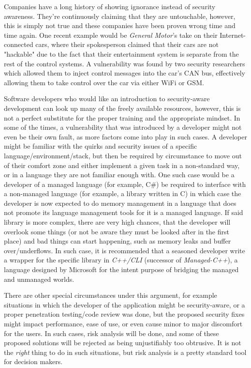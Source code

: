 \documentclass[a4paper,12pt]{article}
\begin{document}
	Companies have a long history of showing ignorance instead of security awareness. They're continuously claiming that they are untouchable, however, this is simply not true and these companies have been proven wrong time and time again. One recent example would be \textit{General Motor}'s take on their Internet-connected cars, where their spokesperson claimed that their cars are not "hackable" due to the fact that their entertainment system is separate from the rest of the control systems. A vulnerability was found by two security researchers\cite{cmiller15} which allowed them to inject control messages into the car's CAN bus, effectively allowing them to take control over the car via either WiFi or GSM.
	
	Software developers who would like an introduction to security-aware development can look up many of the freely available resources, however, this is not a perfect substitute for the proper training and the appropriate mindset. In some of the times, a vulnerability that was introduced by a developer might not even be their own fault, as more factors come into play in such cases. A developer might be familiar with the quirks and security issues of a specific language/environment/stack, but then be required by circumstance to move out of their comfort zone and either implement a given task in a non-standard way, or in a language they are not familiar enough with. One such case would be a developer of a managed language (for example, C\#) be required to interface with a non-managed language (for example, a library written in C) in which case the developer is now expected to do memory management in a language that does not promote its language management tools for it is a managed language. If said library is more complex, there are very high chances, that the developer will overlook some things (or not be aware they must be looked after in the first place) and bad things can start happening, such as memory leaks and buffer over/underflows. In such case, it is recommended that a seasoned developer write a wrapper for the specific library in \textit{C++/CLI} (successor of \textit{Managed-C++}), a language designed by Microsoft for the intent purpose\cite{hstutter06} of bridging the managed and unmanaged worlds.
	
	There are other special circumstances under this argument, for example situations in which the developer of the application might be security-aware, or a proper penetration testing/code review was done, but the proposed security fixes might impact performance, ease of use, or even cause minor to major discomfort for the users. In such cases, risk analysis will be done, and some of these proposed solutions will be rejected as being unjustifiably too obtrusive. It is not the \textit{right} thing to do in such situations, but risk analysis is a pretty standard tool for decision makers.
	
\end{document}
